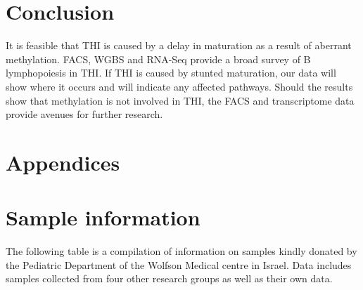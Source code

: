 \documentclass[12pt]{article}
\begin{document}
			
	\section{Conclusion}
	
		It is feasible that THI is caused by a delay in maturation as a result of aberrant methylation. 
		FACS, WGBS and RNA-Seq provide a broad survey of B lymphopoiesis in THI.
		If THI is caused by stunted maturation, our data will show where it occurs and will indicate any affected pathways.
		Should the results show that methylation is not involved in THI, the FACS and transcriptome data provide avenues for further research.


	\section{Appendices}
	\appendix

	
	\section{Sample information}
		
		The following table is a compilation of information on samples kindly donated by the Pediatric Department of the Wolfson Medical centre in Israel. Data includes samples collected from four other research groups as well as their own data. 
\end{document}
